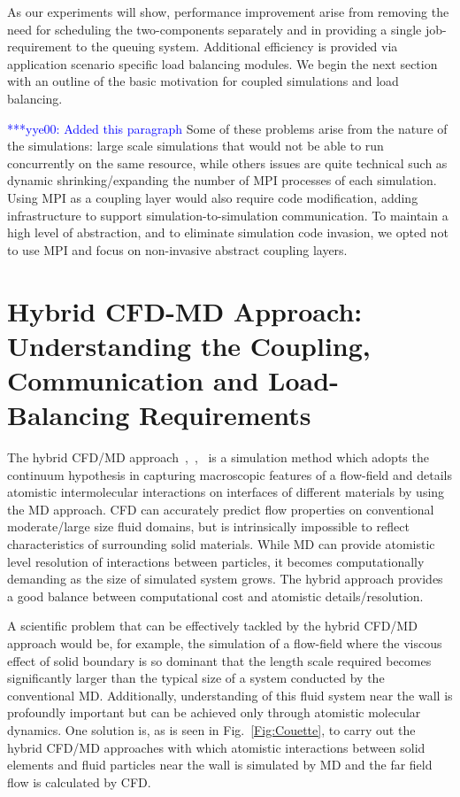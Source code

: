 \documentclass[conference,final]{IEEEtran}
\newcommand{\yyenote}[1]{ {\textcolor{blue} { ***yye00: #1 }}}
\begin{document}
As our experiments will show, performance improvement arise from removing the need for scheduling the two-components separately and in providing a single job-requirement to the queuing system. Additional efficiency is provided via application scenario specific load balancing modules.  We begin the next section with an outline of the basic motivation for coupled simulations and load balancing.

\yyenote{Added this paragraph}
Some of these problems arise from the nature of the simulations: large scale simulations that would not be able to run concurrently on the same resource, while others issues are quite technical such as dynamic shrinking/expanding the number of MPI processes of each simulation. Using MPI as a coupling layer would also require code modification, adding infrastructure to support simulation-to-simulation communication. To maintain a high level of abstraction, and to eliminate simulation code invasion, we opted not to use MPI and focus on non-invasive abstract coupling layers.



\section{Hybrid CFD-MD Approach: Understanding the Coupling, Communication and Load-Balancing Requirements}

The hybrid CFD/MD approach~\cite{Thompson},~\cite{Nie},~\cite{Yen} is a simulation method which adopts the continuum hypothesis in capturing macroscopic features of a flow-field and details atomistic intermolecular interactions on interfaces of different materials by using the MD approach.  CFD can accurately predict flow properties on conventional moderate/large size fluid domains, but is intrinsically impossible to reflect characteristics of surrounding solid materials. While MD can provide atomistic level resolution of interactions between particles, it becomes computationally demanding as the size of simulated system grows. The hybrid approach provides a good balance
between computational cost and atomistic details/resolution.

A scientific problem that can be effectively tackled by the hybrid CFD/MD approach would be, for example, the simulation of a flow-field where the viscous effect of solid boundary is so dominant that the length scale required becomes significantly larger than the typical size of a system conducted by the conventional MD.  Additionally, understanding of this fluid system near the wall is profoundly important but can be achieved only through atomistic molecular dynamics.   One solution is, as is seen in Fig.~\ref{Fig:Couette}, to carry out the hybrid CFD/MD approaches with which atomistic interactions between solid elements and fluid particles near the wall is simulated by MD and the far field flow is calculated by CFD. 
\end{document}
